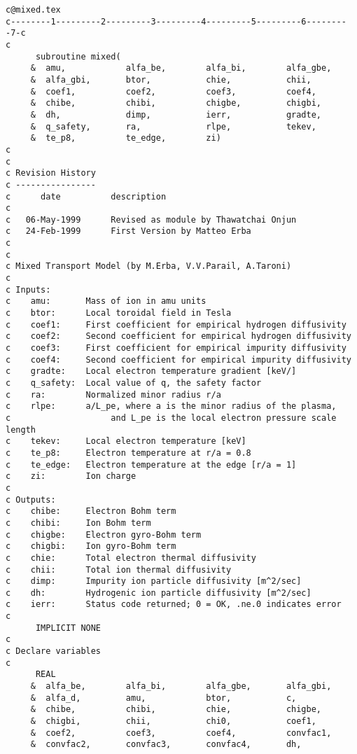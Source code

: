 \documentclass{article}    %
\begin{document}
\begin{verbatim}
c@mixed.tex
c--------1---------2---------3---------4---------5---------6---------7-c
c
      subroutine mixed(
     &  amu,            alfa_be,        alfa_bi,        alfa_gbe,
     &  alfa_gbi,       btor,           chie,           chii,		
     &  coef1,          coef2,          coef3,          coef4,
     &  chibe,          chibi,          chigbe,         chigbi,
     &  dh,             dimp,           ierr,           gradte,         
     &  q_safety,       ra,             rlpe,           tekev,
     &  te_p8,          te_edge,        zi)		
c
c
c Revision History
c ----------------
c      date          description
c     
c   06-May-1999      Revised as module by Thawatchai Onjun
c   24-Feb-1999      First Version by Matteo Erba
c
c
c Mixed Transport Model (by M.Erba, V.V.Parail, A.Taroni)
c
c Inputs:
c    amu:       Mass of ion in amu units
c    btor:      Local toroidal field in Tesla
c    coef1:     First coefficient for empirical hydrogen diffusivity
c    coef2:     Second coefficient for empirical hydrogen diffusivity
c    coef3:     First coefficient for empirical impurity diffusivity
c    coef4:     Second coefficient for empirical impurity diffusivity
c    gradte:    Local electron temperature gradient [keV/]
c    q_safety:  Local value of q, the safety factor
c    ra:       	Normalized minor radius r/a
c    rlpe:     	a/L_pe, where a is the minor radius of the plasma,
c                    and L_pe is the local electron pressure scale length
c    tekev:     Local electron temperature [keV]
c    te_p8:     Electron temperature at r/a = 0.8
c    te_edge:   Electron temperature at the edge [r/a = 1]
c    zi:        Ion charge
c
c Outputs:
c    chibe:     Electron Bohm term
c    chibi:     Ion Bohm term
c    chigbe:    Electron gyro-Bohm term
c    chigbi:    Ion gyro-Bohm term
c    chie:      Total electron thermal diffusivity
c    chii:      Total ion thermal diffusivity
c    dimp:      Impurity ion particle diffusivity [m^2/sec]
c    dh:        Hydrogenic ion particle diffusivity [m^2/sec]
c    ierr:      Status code returned; 0 = OK, .ne.0 indicates error
c
      IMPLICIT NONE
c
c Declare variables
c
      REAL
     &  alfa_be,        alfa_bi,        alfa_gbe,       alfa_gbi,
     &  alfa_d,         amu,            btor,           c,		
     &  chibe,          chibi,          chie,           chigbe,		
     &  chigbi,         chii,           chi0,           coef1,		
     &  coef2,          coef3,          coef4,          convfac1,	
     &  convfac2,       convfac3,       convfac4,       dh,             

\end{verbatim}
\end{document}

